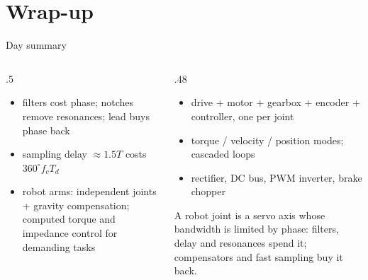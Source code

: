 \documentclass[aspectratio=169,10pt]{beamer}
\begin{document}
\section*{Wrap-up}
\begin{frame}{Day summary}
\begin{columns}[T]
\begin{column}{.5\textwidth}
\begin{defbox}[Control (2.7--2.9)]
\small
\begin{itemize}\setlength\itemsep{.3mm}
\item filters cost phase; notches remove resonances; lead buys phase back
\item sampling delay $\approx1.5T$ costs $360^\circ f_cT_d$
\item robot arms: independent joints + gravity compensation; computed torque and impedance control for demanding tasks
\end{itemize}
\end{defbox}
\end{column}
\begin{column}{.48\textwidth}
\begin{defbox}
\small
\begin{itemize}\setlength\itemsep{.3mm}
\item drive + motor + gearbox + encoder + controller, one per joint
\item torque / velocity / position modes; cascaded loops
\item rectifier, DC bus, PWM inverter, brake chopper
\end{itemize}
\end{defbox}
\begin{keybox}
A robot joint is a servo axis whose bandwidth is limited by phase: filters, delay and resonances spend it; compensators and fast sampling buy it back.
\end{keybox}
\end{column}
\end{columns}
\end{frame}
\end{document}
